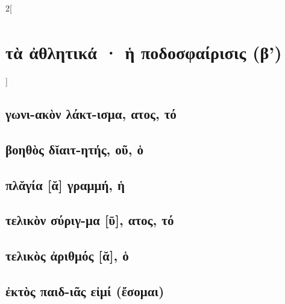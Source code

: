 \documentclass{book}
\begin{document}
\newpage 
\begin{multicols}{2}[\section{τὰ ἀθλητικά · ἡ ποδοσφαίρισις\textsuperscript{\textdagger} (β')}]
{\renewcommand \thesubsection {\thesection} }
\subsection{γωνι-ακὸν λάκτ-ισμα, ατος, τό}
\subsection{βοηθὸς δῐαιτ-ητής, οῦ, ὁ}
\subsection{πλᾰγία [ᾰ] γραμμή, ἡ}
\subsection{τελικὸν σύριγ-μα [ῡ], ατος, τό}
\subsection{τελικὸς ἀριθμός [ᾰ], ὁ}
\subsection{ἐκτὸς παιδ-ιᾶς εἰμί (ἔσομαι)}
~
\end{multicols}
\newpage 
\end{document}

